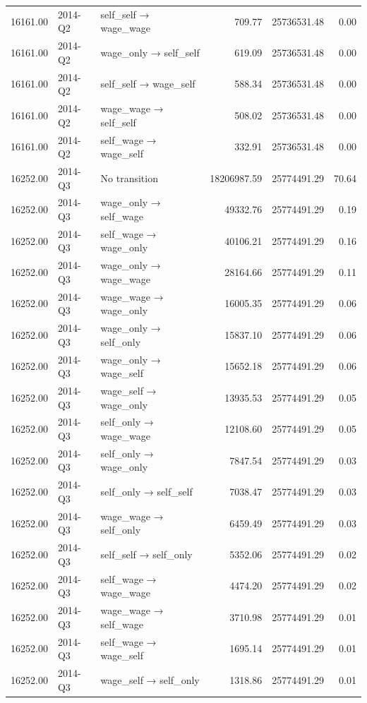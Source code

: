 \begin{table}[ht]
{\begin{tabular}{rllrrr}
  16161.00 & 2014-Q2 & self\_self → wage\_wage & 709.77 & 25736531.48 & 0.00 \\ 
  16161.00 & 2014-Q2 & wage\_only → self\_self & 619.09 & 25736531.48 & 0.00 \\ 
  16161.00 & 2014-Q2 & self\_self → wage\_self & 588.34 & 25736531.48 & 0.00 \\ 
  16161.00 & 2014-Q2 & wage\_wage → self\_self & 508.02 & 25736531.48 & 0.00 \\ 
  16161.00 & 2014-Q2 & self\_wage → wage\_self & 332.91 & 25736531.48 & 0.00 \\ 
  16252.00 & 2014-Q3 & No transition & 18206987.59 & 25774491.29 & 70.64 \\ 
  16252.00 & 2014-Q3 & wage\_only → self\_wage & 49332.76 & 25774491.29 & 0.19 \\ 
  16252.00 & 2014-Q3 & self\_wage → wage\_only & 40106.21 & 25774491.29 & 0.16 \\ 
  16252.00 & 2014-Q3 & wage\_only → wage\_wage & 28164.66 & 25774491.29 & 0.11 \\ 
  16252.00 & 2014-Q3 & wage\_wage → wage\_only & 16005.35 & 25774491.29 & 0.06 \\ 
  16252.00 & 2014-Q3 & wage\_only → self\_only & 15837.10 & 25774491.29 & 0.06 \\ 
  16252.00 & 2014-Q3 & wage\_only → wage\_self & 15652.18 & 25774491.29 & 0.06 \\ 
  16252.00 & 2014-Q3 & wage\_self → wage\_only & 13935.53 & 25774491.29 & 0.05 \\ 
  16252.00 & 2014-Q3 & self\_only → wage\_wage & 12108.60 & 25774491.29 & 0.05 \\ 
  16252.00 & 2014-Q3 & self\_only → wage\_only & 7847.54 & 25774491.29 & 0.03 \\ 
  16252.00 & 2014-Q3 & self\_only → self\_self & 7038.47 & 25774491.29 & 0.03 \\ 
  16252.00 & 2014-Q3 & wage\_wage → self\_only & 6459.49 & 25774491.29 & 0.03 \\ 
  16252.00 & 2014-Q3 & self\_self → self\_only & 5352.06 & 25774491.29 & 0.02 \\ 
  16252.00 & 2014-Q3 & self\_wage → wage\_wage & 4474.20 & 25774491.29 & 0.02 \\ 
  16252.00 & 2014-Q3 & wage\_wage → self\_wage & 3710.98 & 25774491.29 & 0.01 \\ 
  16252.00 & 2014-Q3 & self\_wage → wage\_self & 1695.14 & 25774491.29 & 0.01 \\ 
  16252.00 & 2014-Q3 & wage\_self → self\_only & 1318.86 & 25774491.29 & 0.01 \\ 

\end{tabular}}
\end{table}
